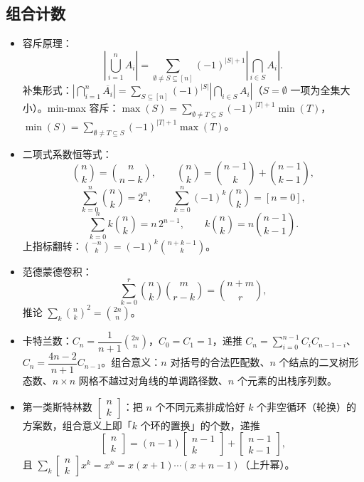 \documentclass[11pt,a4paper]{ctexart}
\begin{document}
\subsection{组合计数}

\begin{itemize}
  \item 容斥原理：
  \[\left|\bigcup_{i=1}^{n}A_i\right|=\sum_{\emptyset\ne S\subseteq[n]}(-1)^{|S|+1}\left|\bigcap_{i\in S}A_i\right|.\]
  补集形式：$\left|\bigcap_{i=1}^{n}\overline{A_i}\right|=\sum_{S\subseteq[n]}(-1)^{|S|}\left|\bigcap_{i\in S}A_i\right|$（$S=\emptyset$ 一项为全集大小）。min-max 容斥：$\max(S)=\sum_{\emptyset\ne T\subseteq S}(-1)^{|T|+1}\min(T)$，$\min(S)=\sum_{\emptyset\ne T\subseteq S}(-1)^{|T|+1}\max(T)$。
  \item 二项式系数恒等式：
  \[\binom{n}{k}=\binom{n}{n-k},\qquad \binom{n}{k}=\binom{n-1}{k}+\binom{n-1}{k-1},\]
  \[\sum_{k=0}^{n}\binom{n}{k}=2^n,\qquad \sum_{k=0}^{n}(-1)^k\binom{n}{k}=[n=0],\]
  \[\sum_{k=0}^{n}k\binom{n}{k}=n\,2^{n-1},\qquad k\binom{n}{k}=n\binom{n-1}{k-1}.\]
  上指标翻转：$\binom{-n}{k}=(-1)^k\binom{n+k-1}{k}$。
  \item 范德蒙德卷积：
  \[\sum_{k=0}^{r}\binom{n}{k}\binom{m}{r-k}=\binom{n+m}{r},\]
  推论 $\sum_{k}\binom{n}{k}^{2}=\binom{2n}{n}$。
  \item 卡特兰数：$C_n=\dfrac{1}{n+1}\binom{2n}{n}$，$C_0=C_1=1$，递推 $C_n=\sum_{i=0}^{n-1}C_iC_{n-1-i}$、$C_n=\dfrac{4n-2}{n+1}C_{n-1}$。组合意义：$n$ 对括号的合法匹配数、$n$ 个结点的二叉树形态数、$n\times n$ 网格不越过对角线的单调路径数、$n$ 个元素的出栈序列数。
  \item 第一类斯特林数 $\begin{bmatrix}n\\k\end{bmatrix}$：把 $n$ 个不同元素排成恰好 $k$ 个非空循环（轮换）的方案数，组合意义上即「$k$ 个环的置换」的个数，递推
  \[\begin{bmatrix}n\\k\end{bmatrix}=(n-1)\begin{bmatrix}n-1\\k\end{bmatrix}+\begin{bmatrix}n-1\\k-1\end{bmatrix},\]
  且 $\sum_{k}\begin{bmatrix}n\\k\end{bmatrix}x^{k}=x^{\overline n}=x(x+1)\cdots(x+n-1)$（上升幂）。

\end{itemize}
\end{document}
